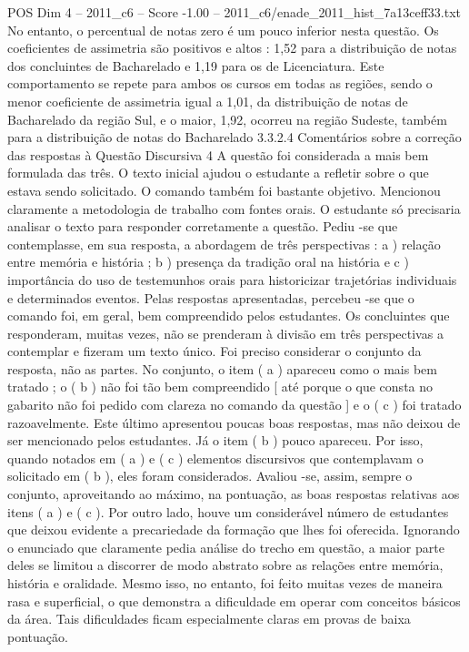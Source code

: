 \begin{textsample}{POS Dim 4 – 2011\_c6 – Score -1.00 – 2011\_c6/enade\_2011\_hist\_7a13ceff33.txt}
No entanto, o percentual de notas zero é um pouco inferior nesta questão.
Os coeficientes de assimetria são positivos e altos : 1,52 para a distribuição de notas dos concluintes de Bacharelado e 1,19 para os de Licenciatura.
Este comportamento se repete para ambos os cursos em todas as regiões, sendo o menor coeficiente de assimetria igual a 1,01, da distribuição de notas de Bacharelado da região Sul, e o maior, 1,92, ocorreu na região Sudeste, também para a distribuição de notas do Bacharelado 3.3.2.4 Comentários sobre a correção das respostas à Questão Discursiva 4 A questão foi considerada a mais bem formulada das três.
O texto inicial ajudou o estudante a refletir sobre o que estava sendo solicitado.
O comando também foi bastante objetivo.
Mencionou claramente a metodologia de trabalho com fontes orais.
O estudante só precisaria analisar o texto para responder corretamente a questão.
Pediu -se que contemplasse, em sua resposta, a abordagem de três perspectivas : a ) relação entre memória e história ; b ) presença da tradição oral na história e c ) importância do uso de testemunhos orais para historicizar trajetórias individuais e determinados eventos.
Pelas respostas apresentadas, percebeu -se que o comando foi, em geral, bem compreendido pelos estudantes.
Os concluintes que responderam, muitas vezes, não se prenderam à divisão em três perspectivas a contemplar e fizeram um texto único.
Foi preciso considerar o conjunto da resposta, não as partes.
No conjunto, o item ( a ) apareceu como o mais bem tratado ; o ( b ) não foi tão bem compreendido [ até porque o que consta no gabarito não foi pedido com clareza no comando da questão ] e o ( c ) foi tratado razoavelmente.
Este último apresentou poucas boas respostas, mas não deixou de ser mencionado pelos estudantes.
Já o item ( b ) pouco apareceu.
Por isso, quando notados em ( a ) e ( c ) elementos discursivos que contemplavam o solicitado em ( b ), eles foram considerados.
Avaliou -se, assim, sempre o conjunto, aproveitando ao máximo, na pontuação, as boas respostas relativas aos itens ( a ) e ( c ).
Por outro lado, houve um considerável número de estudantes que deixou evidente a precariedade da formação que lhes foi oferecida.
Ignorando o enunciado que claramente pedia análise do trecho em questão, a maior parte deles se limitou a discorrer de modo abstrato sobre as relações entre memória, história e oralidade.
Mesmo isso, no entanto, foi feito muitas vezes de maneira rasa e superficial, o que demonstra a dificuldade em operar com conceitos básicos da área.
Tais dificuldades ficam especialmente claras em provas de baixa pontuação.

\end{textsample}
